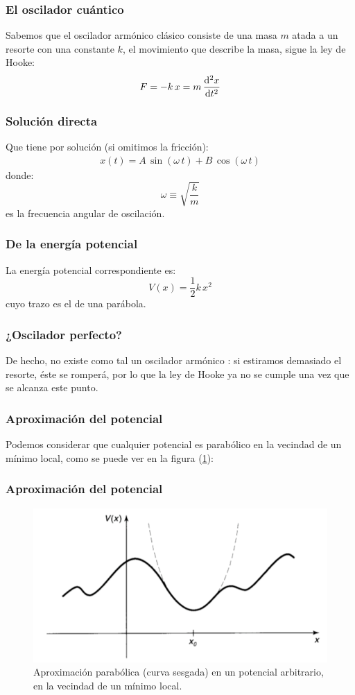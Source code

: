\documentclass[12pt]{beamer}
\begin{document}
\begin{frame}
\frametitle{El oscilador cuántico}
Sabemos que el oscilador armónico clásico consiste de una masa $m$ atada a un resorte con una constante $k$, el movimiento que describe la masa, sigue la ley de Hooke:
\pause
\begin{align*}
F = - k \, x = m \, \dv[2]{x}{t}
\end{align*}
\end{frame}
\begin{frame}
\frametitle{Solución directa}
Que tiene por solución (si omitimos la fricción):
\pause
\begin{align*}
x(t) = A \, \sin (\omega \, t) + B \, \cos (\omega \, t)
\end{align*}
\pause
donde:
\pause
\begin{equation}
\omega \equiv \sqrt{\dfrac{k}{m}}
\label{eq:ecuacion_02_036}
\end{equation}
es la frecuencia angular de oscilación.
\end{frame}
\begin{frame}
\frametitle{De la energía potencial}
La energía potencial correspondiente es:
\pause
\begin{equation}
V(x) = \dfrac{1}{2} k \, x^{2}
\label{eq:ecuacion_02_037}
\end{equation}
cuyo trazo es el de una parábola.
\end{frame}
\begin{frame}
\frametitle{¿Oscilador perfecto?}
De hecho, no existe como tal un oscilador armónico : \pause si estiramos demasiado el resorte, éste se romperá, por lo que la ley de Hooke ya no se cumple una vez que se alcanza este punto.
\end{frame}
\begin{frame}
\frametitle{Aproximación del potencial}
Podemos considerar que cualquier potencial es  parabólico en la vecindad de un mínimo local, como se puede ver en la figura (\ref{fig:figura_001}):
\end{frame}
\begin{frame}
\frametitle{Aproximación del potencial}
\begin{figure}[H]
    \centering
    \includegraphics[scale=0.4]{Imagenes/Potencial_arbitrario.png}
    \caption{Aproximación parabólica (curva sesgada) en un potencial arbitrario, en la vecindad de un mínimo local.}
    \label{fig:figura_001}
\end{figure}
\end{frame}
\end{document}
